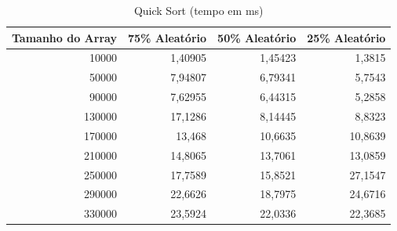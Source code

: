\documentclass[a4paper, 12pt]{article}
\begin{document}
		\begin{longtable}[c]{@{}rrrr@{}}
		\caption{Quick Sort (tempo em ms)}
			\label{tab:quick2-table}\\
			\toprule
			\multicolumn{1}{l}{\textbf{Tamanho do Array}} & \multicolumn{1}{c}{\textbf{75\% Aleatório}} & \multicolumn{1}{c}{\textbf{50\% Aleatório}} & \multicolumn{1}{c}{\textbf{25\% Aleatório}} \\* \midrule
			\endfirsthead
			\endhead
			\multicolumn{1}{|r|}{10000}                   & \multicolumn{1}{r|}{1,40905}                & \multicolumn{1}{r|}{1,45423}                & \multicolumn{1}{r|}{1,3815}                 \\* \midrule
			\multicolumn{1}{|r|}{50000}                   & \multicolumn{1}{r|}{7,94807}                & \multicolumn{1}{r|}{6,79341}                & \multicolumn{1}{r|}{5,7543}                 \\* \midrule
			\multicolumn{1}{|r|}{90000}                   & \multicolumn{1}{r|}{7,62955}                & \multicolumn{1}{r|}{6,44315}                & \multicolumn{1}{r|}{5,2858}                 \\* \midrule
			\multicolumn{1}{|r|}{130000}                  & \multicolumn{1}{r|}{17,1286}                & \multicolumn{1}{r|}{8,14445}                & \multicolumn{1}{r|}{8,8323}                 \\* \midrule
			\multicolumn{1}{|r|}{170000}                  & \multicolumn{1}{r|}{13,468}                 & \multicolumn{1}{r|}{10,6635}                & \multicolumn{1}{r|}{10,8639}                \\* \midrule
			\multicolumn{1}{|r|}{210000}                  & \multicolumn{1}{r|}{14,8065}                & \multicolumn{1}{r|}{13,7061}                & \multicolumn{1}{r|}{13,0859}                \\* \midrule
			\multicolumn{1}{|r|}{250000}                  & \multicolumn{1}{r|}{17,7589}                & \multicolumn{1}{r|}{15,8521}                & \multicolumn{1}{r|}{27,1547}                \\* \midrule
			\multicolumn{1}{|r|}{290000}                  & \multicolumn{1}{r|}{22,6626}                & \multicolumn{1}{r|}{18,7975}                & \multicolumn{1}{r|}{24,6716}                \\* \midrule
			\multicolumn{1}{|r|}{330000}                  & \multicolumn{1}{r|}{23,5924}                & \multicolumn{1}{r|}{22,0336}                & \multicolumn{1}{r|}{22,3685}                \\* \midrule

\end{longtable}
\end{document}
